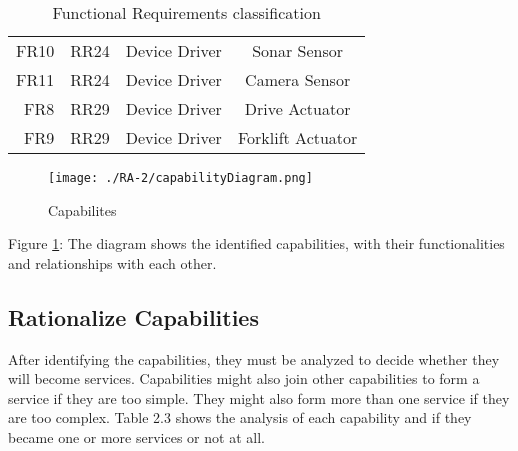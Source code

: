 \begin{table}
\begin{tabular}{| r | p{2cm} | c | c |}
		\hline
		FR10 & RR24 & Device Driver & Sonar Sensor\\
		FR11 & RR24 & Device Driver & Camera Sensor\\
		FR8 & RR29 & Device Driver & Drive Actuator\\
		FR9 & RR29 & Device Driver & Forklift Actuator\\
	 	\hline
	\end{tabular}
	\caption{Functional Requirements classification}
\end{table}


\begin{figure}[ht!]
 \centering
 \texttt{[image: ./RA-2/capabilityDiagram.png]}
 \caption{Capabilites}
 \label{fig:capabilities}
\end{figure}

Figure \ref{fig:capabilities}: The diagram shows the identified capabilities, with their functionalities and relationships with each other.

\subsection{Rationalize Capabilities}
After identifying the capabilities, they must be analyzed to decide whether they will become services. Capabilities might also join other capabilities to form a service if they are too simple. They might also form more than one service if they are too complex. Table 2.3 shows the analysis of each capability and if they became one or more services or not at all.

